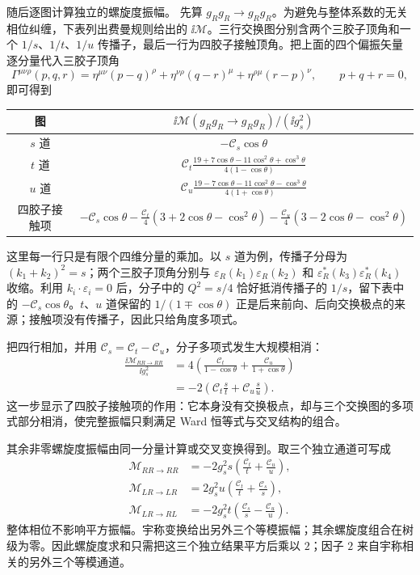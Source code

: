 \begin{derivation}
随后逐图计算独立的螺旋度振幅。
先算 $g_Rg_R\to g_Rg_R$。为避免与整体系数的无关相位纠缠，下表列出费曼规则给出的 $\ii\mathcal M$。三行交换图分别含两个三胶子顶角和一个 $1/s$、$1/t$、$1/u$ 传播子，最后一行为四胶子接触顶角。把上面的四个偏振矢量逐分量代入三胶子顶角
\begin{equation*}
 \Gamma^{\mu\nu\rho}(p,q,r)
 =\eta^{\mu\nu}(p-q)^\rho
 +\eta^{\nu\rho}(q-r)^\mu
 +\eta^{\rho\mu}(r-p)^\nu,
 \qquad p+q+r=0,
\end{equation*}
即可得到
\begin{center}
\begin{tabular}{c|c}
图 & $\ii\mathcal M(g_Rg_R\to g_Rg_R)/(\ii g_s^2)$\\ \hline
$s$ 道 & $-\mathcal C_s\cos\theta$\\[2pt]
$t$ 道 & $\displaystyle
 \mathcal C_t\frac{19+7\cos\theta-11\cos^2\theta+\cos^3\theta}
 {4(1-\cos\theta)}$\\[8pt]
$u$ 道 & $\displaystyle
 \mathcal C_u\frac{19-7\cos\theta-11\cos^2\theta-\cos^3\theta}
 {4(1+\cos\theta)}$\\[8pt]
四胶子接触项 & $\displaystyle
 -\mathcal C_s\cos\theta
 -\frac{\mathcal C_t}{4}(3+2\cos\theta-\cos^2\theta)
 -\frac{\mathcal C_u}{4}(3-2\cos\theta-\cos^2\theta)$
\end{tabular}
\end{center}
这里每一行只是有限个四维分量的乘加。以 $s$ 道为例，传播子分母为 $(k_1+k_2)^2=s$；两个三胶子顶角分别与
$\varepsilon_R(k_1)\varepsilon_R(k_2)$ 和
$\varepsilon_R^*(k_3)\varepsilon_R^*(k_4)$ 收缩。利用
$k_i\cdot\varepsilon_i=0$ 后，分子中的 $Q^2=s/4$ 恰好抵消传播子的 $1/s$，留下表中的 $-\mathcal C_s\cos\theta$。$t$、$u$ 道保留的 $1/(1\mp\cos\theta)$ 正是后来前向、后向交换极点的来源；接触项没有传播子，因此只给角度多项式。

把四行相加，并用 $\mathcal C_s=\mathcal C_t-\mathcal C_u$，分子多项式发生大规模相消：
\begin{align*}
 \frac{\ii\mathcal M_{RR\to RR}}{\ii g_s^2}
 &=4\left(
 \frac{\mathcal C_t}{1-\cos\theta}
 +\frac{\mathcal C_u}{1+\cos\theta}
 \right)\\
 &=-2\left(
 \mathcal C_t\frac{s}{t}
 +\mathcal C_u\frac{s}{u}
 \right).
\end{align*}
这一步显示了四胶子接触项的作用：它本身没有交换极点，却与三个交换图的多项式部分相消，使完整振幅只剩满足 Ward 恒等式与交叉结构的组合。

其余非零螺旋度振幅由同一分量计算或交叉变换得到。取三个独立通道可写成
\begin{align*}
 \mathcal M_{RR\to RR}
 &=-2g_s^2s\left(\frac{\mathcal C_t}{t}+\frac{\mathcal C_u}{u}\right),\\
 \mathcal M_{LR\to LR}
 &=2g_s^2u\left(\frac{\mathcal C_t}{t}+\frac{\mathcal C_s}{s}\right),\\
 \mathcal M_{LR\to RL}
 &=-2g_s^2t\left(\frac{\mathcal C_s}{s}-\frac{\mathcal C_u}{u}\right).
\end{align*}
整体相位不影响平方振幅。宇称变换给出另外三个等模振幅；其余螺旋度组合在树级为零。因此螺旋度求和只需把这三个独立结果平方后乘以 $2$；因子 $2$ 来自宇称相关的另外三个等模通道。


\end{derivation}
